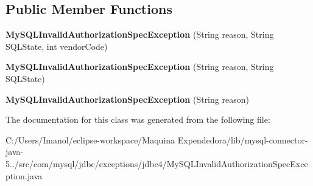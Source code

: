 \subsection*{Public Member Functions}
\begin{DoxyCompactItemize}
\item 
\mbox{\label{classcom_1_1mysql_1_1jdbc_1_1exceptions_1_1jdbc4_1_1_my_s_q_l_invalid_authorization_spec_exception_a2820dd862168630b03f40037db60e11a}} 
{\bfseries My\+S\+Q\+L\+Invalid\+Authorization\+Spec\+Exception} (String reason, String S\+Q\+L\+State, int vendor\+Code)
\item 
\mbox{\label{classcom_1_1mysql_1_1jdbc_1_1exceptions_1_1jdbc4_1_1_my_s_q_l_invalid_authorization_spec_exception_a45da1b73519a773a6aff1bce23e0f3df}} 
{\bfseries My\+S\+Q\+L\+Invalid\+Authorization\+Spec\+Exception} (String reason, String S\+Q\+L\+State)
\item 
\mbox{\label{classcom_1_1mysql_1_1jdbc_1_1exceptions_1_1jdbc4_1_1_my_s_q_l_invalid_authorization_spec_exception_a944c48e49555e7c6fbcc1bef7147f56c}} 
{\bfseries My\+S\+Q\+L\+Invalid\+Authorization\+Spec\+Exception} (String reason)
\end{DoxyCompactItemize}


The documentation for this class was generated from the following file\+:\begin{DoxyCompactItemize}
\item 
C\+:/\+Users/\+Imanol/eclipse-\/workspace/\+Maquina Expendedora/lib/mysql-\/connector-\/java-\/5../src/com/mysql/jdbc/exceptions/jdbc4/My\+S\+Q\+L\+Invalid\+Authorization\+Spec\+Exception.\+java\end{DoxyCompactItemize}
